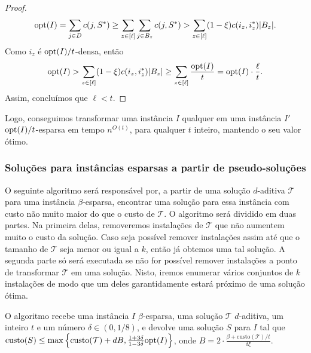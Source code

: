 \begin{proof}
    \begin{subequations}
        \begin{align*}
            \mathrm{opt}(I) = \sum_{j \in D} c(j,S^*) \geq \sum_{z \in [\ell]} \sum_{ j\in B_z} c(j,S^*) > \sum_{z \in [\ell]} (1 - \xi ) c(i_z,i_z^*) |B_z|.
        \end{align*}
    \end{subequations}
    Como $i_z$ é $\mathrm{opt}(I)/t$-densa, então
    \begin{subequations}
        \begin{align*}
            \mathrm{opt}(I) > \sum_{z \in [\ell]} (1 - \xi ) c(i_z,i_z^*) |B_z| \geq \sum_{z \in [\ell]} \frac{\mathrm{opt}(I)}{t} = \mathrm{opt}(I)\cdot\frac{\ell}{t}.
        \end{align*}
    \end{subequations}
    Assim, concluímos que $\ell < t$.
\end{proof}

Logo, conseguimos transformar uma instância $I$ qualquer em uma instância $I'$ $\mathrm{opt}(I)/t$-esparsa em tempo $n^{O(t)}$, para qualquer $t$ inteiro, mantendo o seu valor ótimo.

\subsubsection{Soluções para instâncias esparsas a partir de pseudo-soluções}

O seguinte algoritmo será responsável por, a partir de uma solução $d$-aditiva $\mathcal{T}$ para uma instância $\beta$-esparsa, encontrar uma solução para essa instância com custo não muito maior do que o custo de $\mathcal{T}$. O algoritmo será dividido em duas partes. Na primeira delas, removeremos instalações de $\mathcal{T}$ que não aumentem muito o custo da solução. Caso seja possível remover instalações assim até que o tamanho de $\mathcal{T}$ seja menor ou igual a $k$, então já obtemos uma tal solução. A segunda parte só será executada se não for possível remover instalações a ponto de transformar $\mathcal{T}$ em uma solução. Nisto, iremos enumerar vários conjuntos de $k$ instalações de modo que um deles garantidamente estará próximo de uma solução ótima.

O algoritmo recebe uma instância $I$ $\beta$-esparsa, uma solução $\mathcal{T}$ $d$-aditiva, um inteiro $t$ e um número $\delta \in (0,1/8)$, e devolve uma solução $S$ para $I$ tal que ${\text{custo}(S) \leq \max \left\{ \text{custo}(\mathcal{T}) + dB, \frac{1+3\delta}{1-3\delta} \mathrm{opt}(I)\right\}}$, onde $B = 2 \cdot \frac{\beta + \text{custo}(\mathcal{T})/t}{\delta\xi}$.

